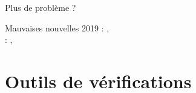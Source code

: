 \documentclass{backend/backend}
\begin{document}
\begin{frame}{Plus de problème ?}
    \pause
    \begin{blockSimple}{Mauvaises nouvelles }
        2019 : \citeauthor{binsecRel2019}, \\
         : \citeauthor{schneider2024breakingbadcompilersbreak}, 
    \end{blockSimple}
\end{frame}

%
%

\section{Outils de vérifications}
\end{document}
